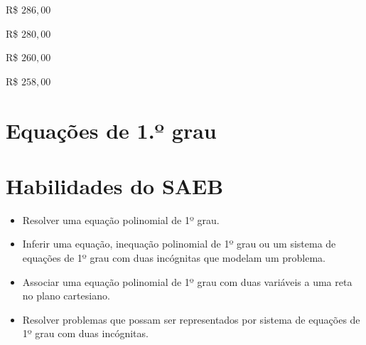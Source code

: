 \begin{escolha}
  \item R\$ $286,00$
  \item R\$ $280,00$
  \item R\$ $260,00$
  \item R\$ $258,00$
\end{escolha}


\section{Equações de 1.º grau}

\section{Habilidades do SAEB }
\begin{itemize}
\item Resolver uma equação polinomial de 1º grau.
\item
  Inferir uma equação, inequação polinomial de 1º grau ou um sistema de
  equações de 1º grau com duas incógnitas que modelam um problema.
\item
  Associar uma equação polinomial de 1º grau com duas variáveis a uma
  reta no plano cartesiano.
\item
  Resolver problemas que possam ser representados por sistema de
  equações de 1º grau com duas incógnitas.
\end{itemize}

